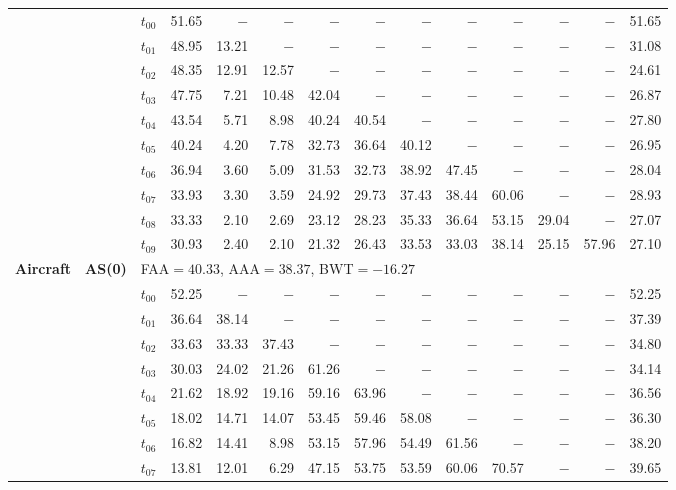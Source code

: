 \begin{table}[ht]
\begin{tabular}{@{}l l l *{11}{r}@{}}
 & & $t_{00}$ & 51.65 & $-$ & $-$ & $-$ & $-$ & $-$ & $-$ & $-$ & $-$ & $-$ & 51.65 \\
 & & $t_{01}$ & 48.95 & 13.21 & $-$ & $-$ & $-$ & $-$ & $-$ & $-$ & $-$ & $-$ & 31.08 \\
 & & $t_{02}$ & 48.35 & 12.91 & 12.57 & $-$ & $-$ & $-$ & $-$ & $-$ & $-$ & $-$ & 24.61 \\
 & & $t_{03}$ & 47.75 & 7.21 & 10.48 & 42.04 & $-$ & $-$ & $-$ & $-$ & $-$ & $-$ & 26.87 \\
 & & $t_{04}$ & 43.54 & 5.71 & 8.98 & 40.24 & 40.54 & $-$ & $-$ & $-$ & $-$ & $-$ & 27.80 \\
 & & $t_{05}$ & 40.24 & 4.20 & 7.78 & 32.73 & 36.64 & 40.12 & $-$ & $-$ & $-$ & $-$ & 26.95 \\
 & & $t_{06}$ & 36.94 & 3.60 & 5.09 & 31.53 & 32.73 & 38.92 & 47.45 & $-$ & $-$ & $-$ & 28.04 \\
 & & $t_{07}$ & 33.93 & 3.30 & 3.59 & 24.92 & 29.73 & 37.43 & 38.44 & 60.06 & $-$ & $-$ & 28.93 \\
 & & $t_{08}$ & 33.33 & 2.10 & 2.69 & 23.12 & 28.23 & 35.33 & 36.64 & 53.15 & 29.04 & $-$ & 27.07 \\
 & & $t_{09}$ & 30.93 & 2.40 & 2.10 & 21.32 & 26.43 & 33.53 & 33.03 & 38.14 & 25.15 & 57.96 & 27.10 \\
\midrule
\multirow{11}{*}{\textbf{Aircraft}} & \multirow{11}{*}{\textbf{AS(0)}} & \multicolumn{12}{l}{\quad\small FAA$=40.33$,\; AAA$=38.37$,\; BWT$=-16.27$} \\
 & & $t_{00}$ & 52.25 & $-$ & $-$ & $-$ & $-$ & $-$ & $-$ & $-$ & $-$ & $-$ & 52.25 \\
 & & $t_{01}$ & 36.64 & 38.14 & $-$ & $-$ & $-$ & $-$ & $-$ & $-$ & $-$ & $-$ & 37.39 \\
 & & $t_{02}$ & 33.63 & 33.33 & 37.43 & $-$ & $-$ & $-$ & $-$ & $-$ & $-$ & $-$ & 34.80 \\
 & & $t_{03}$ & 30.03 & 24.02 & 21.26 & 61.26 & $-$ & $-$ & $-$ & $-$ & $-$ & $-$ & 34.14 \\
 & & $t_{04}$ & 21.62 & 18.92 & 19.16 & 59.16 & 63.96 & $-$ & $-$ & $-$ & $-$ & $-$ & 36.56 \\
 & & $t_{05}$ & 18.02 & 14.71 & 14.07 & 53.45 & 59.46 & 58.08 & $-$ & $-$ & $-$ & $-$ & 36.30 \\
 & & $t_{06}$ & 16.82 & 14.41 & 8.98 & 53.15 & 57.96 & 54.49 & 61.56 & $-$ & $-$ & $-$ & 38.20 \\
 & & $t_{07}$ & 13.81 & 12.01 & 6.29 & 47.15 & 53.75 & 53.59 & 60.06 & 70.57 & $-$ & $-$ & 39.65 \\

\end{tabular}
\end{table}
